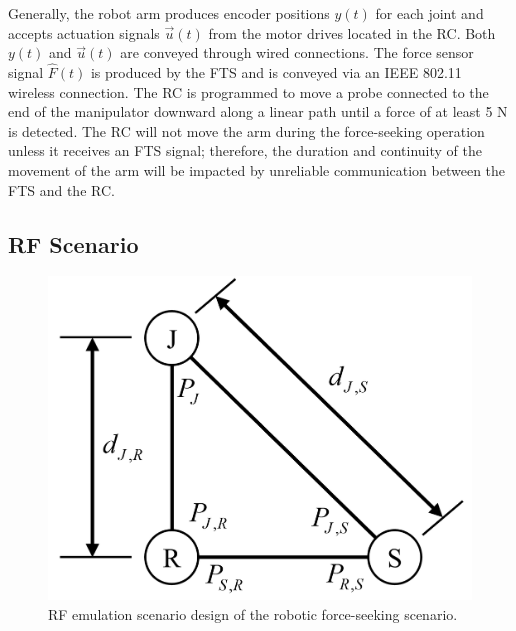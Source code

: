 
Generally, the robot arm produces encoder positions $y(t)$ for each joint and accepts actuation signals $\vec{u}(t)$ from the motor drives located in the RC.  Both $y(t)$ and $\vec{u}(t)$ are conveyed through wired connections. The force sensor signal $\hat{F}(t)$ is produced by the FTS and is conveyed via an IEEE 802.11 wireless connection. The RC is programmed to move a probe connected to the end of the manipulator downward along a linear path until a force of at least 5 N is detected.  The RC will not move the arm during the force-seeking operation unless it receives an FTS signal; therefore, the duration and continuity of the movement of the arm will be impacted by unreliable communication between the FTS and the RC.

\subsection{RF Scenario}\label{ftml:sec:rfemulator}

\begin{figure}[tbp]
    \centering
    \includegraphics[width=0.75\columnwidth]{./chapter-ftml/diagrams/emulation-model}
    \caption{RF emulation scenario design of the robotic force-seeking scenario.}
    \label{fig:rf-emulation-scenario}
\end{figure}


